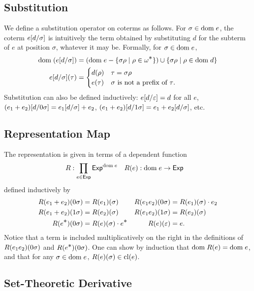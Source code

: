 \documentclass{article}
\newcommand\Exp{\mathsf{Exp}}
\renewcommand\star{^{\textstyle *}}
\newcommand\clname{\mathrm{cl}}
\newcommand\cl[1]{\clname(#1)}
\begin{document}
\subsection*{Substitution}

We define a substitution operator on coterms as follows. For $\sigma\in\dom e$, the coterm $e\subst d\sigma$ is intuitively the term obtained by substituting $d$ for the subterm of $e$ at position $\sigma$, whatever it may be. Formally, for $\sigma\in\dom e$,
\begin{align*}
\dom{(e\subst d\sigma)} &= (\dom e - \set{\sigma\rho}{\rho\in\omega\star})\cup\set{\sigma\rho}{\rho\in\dom d}\\
e\subst d\sigma(\tau) &= \begin{cases}
d(\rho) & \tau = \sigma\rho\\
e(\tau) & \text{$\sigma$ is not a prefix of $\tau$.}
\end{cases}
\end{align*}
Substitution can also be defined inductively: $e\subst d\eps = d$ for all $e$, $(e_1+e_2)\subst d{0\sigma}=e_1\subst d\sigma + e_2$, $(e_1+e_2)\subst d{1\sigma}=e_1 + e_2\subst d\sigma$, etc.

\subsection*{Representation Map}

The representation is given in terms of a dependent function
\begin{align*}
\repname &: \prod_{e\in\Exp}\Exp^{\dom e} & \repone e &: \dom e\to\Exp
\end{align*}
defined inductively by
\begin{align*}
\rep{0\sigma}{e_1+e_2} &= \rep\sigma{e_1} & \rep{0\sigma}{e_1e_2} &= \rep\sigma{e_1}\cdot e_2\\
\rep{1\sigma}{e_1+e_2} &= \rep\sigma{e_2} & \rep{1\sigma}{e_1e_2} &= \rep\sigma{e_2}\\
\rep{0\sigma}{e\star} &= \rep\sigma e\cdot e\star & \rep\eps e &= e.
\end{align*}
Notice that a term is included multiplicatively on the right in the definitions of $\rep{0\sigma}{e_1e_2}$ and $\rep{0\sigma}{e\star}$.
One can show by induction that $\dom{\repone e}=\dom e$, and that for any $\sigma\in\dom e$, $\rep\sigma e\in\cl e$.

\subsection*{Set-Theoretic Derivative}
\end{document}
